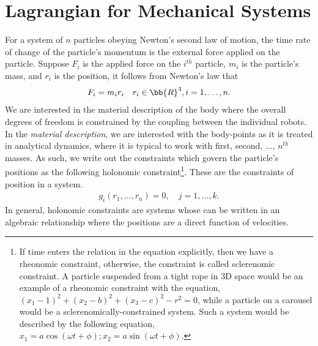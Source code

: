 \section{Lagrangian for Mechanical Systems }
%
For a system of $n$ particles obeying Newton's second law of motion, the time rate of change of the particle's momentum is the external force applied on the particle. Suppose $F_i$ is the applied force on the $i^{th}$ particle, $m_i$ is the particle's mass, and $r_i$ is the position, it follows from Newton's law that 
%
\begin{align}
	F_i = m_i r_i \quad r_i \in \bb{R}^3, i = 1, \ldots, n.
	\label{eq:RBD_Newton}
\end{align}
%
We are interested in the material description of the body where the overall degrees of freedom is constrained by the coupling between the individual robots. In the \textit{material description}, we are interested with the body-points as it is treated in analytical dynamics, where it is typical to work with first, second, $\ldots$, $n^{th}$ masses. As such, we write out the constraints which govern the particle's positions as the following holonomic constraint\footnote{
%
If time enters the relation in the equation explicitly, then we have a rheonomic constraint, otherwise, the constraint is called sclerenomic constraint. A particle suspended from a tight rope in 3D space would be an example of a rheonomic constraint with the equation, $(x_1-1)^2  + (x_2 - b)^2 + (x_3-c)^2 - r^2 = 0$, while a particle on a carousel would be a sclerenomically-constrained system. Such a system would be described by the following equation, $x_1 = a \cos(\omega t + \phi); x_2 = a \sin (\omega t + \phi).$}. These are the constraints of position in a system.  
%
\begin{align}
g_i(r_1, \ldots, r_n) = 0, \quad j = 1, \ldots, k.
\label{eq:holonomic}
\end{align} 
%
In general, holonomic constraints are systems whose \dofs can be written in an algebraic relationship where the positions are a direct function of velocities. 

